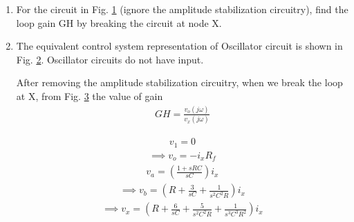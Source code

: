 \begin{enumerate}[label=\thesection.\arabic*.,ref=\thesection.\theenumi]
\renewcommand{\thefigure}{\theenumi.\arabic{figure}}

\item For the circuit in Fig. \ref{fig:ee18btech11050_f1} (ignore the amplitude stabilization circuitry), find the loop gain GH by breaking the circuit at node X. 

\begin{figure}[!ht]
	\begin{center}
		\resizebox{\columnwidth}{!}{}
	\end{center}
\caption{}
\label{fig:ee18btech11050_f1}
\end{figure}

\item \solution
The equivalent control system representation of Oscillator circuit is shown in Fig. \ref{fig:ee18btech11050_f4}. Oscillator circuits do not have input.
\begin{figure}[!ht]
	\begin{center}
		\resizebox{\columnwidth}{!}{}
	\end{center}
\caption{}
\label{fig:ee18btech11050_f4}
\end{figure}
After removing the amplitude stabilization circuitry, when we break the loop at X, from Fig. \ref{fig:ee18btech11050_f2} the value of gain
\begin{align}
    GH = \frac{v_o(j\omega)}{v_x(j\omega)}
\end{align}

\begin{figure}[!ht]
	\begin{center}
		\resizebox{\columnwidth}{!}{}
	\end{center}
\caption{}
\label{fig:ee18btech11050_f2}
\end{figure}
\begin{align}
    v_1 = 0
\end{align}
\begin{align}
    \implies v_o = -i_xR_f
    \label{ee18btech11050_eq1}
\end{align}
\begin{align}
    v_a = (\frac{1+sRC}{sC})i_x
\end{align}
\begin{align}
    \implies v_b = (R + \frac{3}{sC} + \frac{1}{s^2C^2R})i_x
\end{align}
\begin{align}
    \implies v_x = (R + \frac{6}{sC} + \frac{5}{s^2C^2R} + \frac{1}{s^3C^3R^2})i_x
\end{align}


\end{enumerate}
